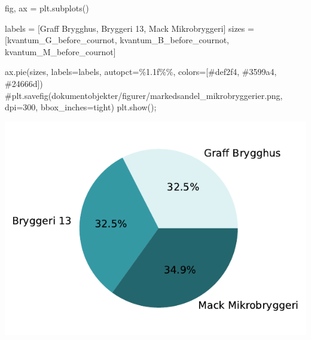 \documentclass[
  12pt,
  a4paper,
  DIV=11,
  numbers=noendperiod]{scrartcl}
\newenvironment{Shaded}{\begin{snugshade}}{\end{snugshade}}
\newcommand{\CommentTok}[1]{\textcolor[rgb]{0.37,0.37,0.37}{#1}}
\newcommand{\NormalTok}[1]{\textcolor[rgb]{0.00,0.23,0.31}{#1}}
\newcommand{\OperatorTok}[1]{\textcolor[rgb]{0.37,0.37,0.37}{#1}}
\newcommand{\SpecialCharTok}[1]{\textcolor[rgb]{0.37,0.37,0.37}{#1}}
\newcommand{\StringTok}[1]{\textcolor[rgb]{0.13,0.47,0.30}{#1}}
\begin{document}
\begin{Shaded}
\begin{Highlighting}[]
\NormalTok{fig, ax }\OperatorTok{=}\NormalTok{ plt.subplots()}

\NormalTok{labels }\OperatorTok{=}\NormalTok{ [}\StringTok{\textquotesingle{}Graff Brygghus\textquotesingle{}}\NormalTok{, }\StringTok{\textquotesingle{}Bryggeri 13\textquotesingle{}}\NormalTok{, }\StringTok{\textquotesingle{}Mack Mikrobryggeri\textquotesingle{}}\NormalTok{]}
\NormalTok{sizes }\OperatorTok{=}\NormalTok{ [kvantum\_G\_before\_cournot, kvantum\_B\_before\_cournot, kvantum\_M\_before\_cournot]}

\NormalTok{ax.pie(sizes, labels}\OperatorTok{=}\NormalTok{labels, autopct}\OperatorTok{=}\StringTok{\textquotesingle{}}\SpecialCharTok{\%1.1f\%\%}\StringTok{\textquotesingle{}}\NormalTok{, colors}\OperatorTok{=}\NormalTok{[}\StringTok{\textquotesingle{}\#def2f4\textquotesingle{}}\NormalTok{, }\StringTok{\textquotesingle{}\#3599a4\textquotesingle{}}\NormalTok{, }\StringTok{\textquotesingle{}\#24666d\textquotesingle{}}\NormalTok{])}
\CommentTok{\#plt.savefig(\textquotesingle{}dokumentobjekter/figurer/markedsandel\_mikrobryggerier.png\textquotesingle{}, dpi=300, bbox\_inches=\textquotesingle{}tight\textquotesingle{})}
\NormalTok{plt.show()}\OperatorTok{;}
\end{Highlighting}
\end{Shaded}

\includegraphics{18_SOK2030_mappeoppgave_2_V24_files/figure-pdf/cell-33-output-1.pdf}
\end{document}
